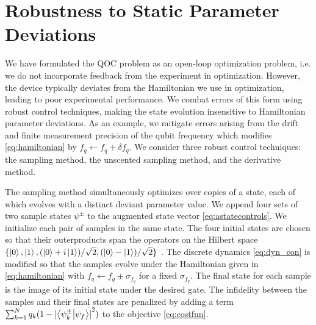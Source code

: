 \section{Robustness to Static Parameter Deviations \label{sec:static}}
We have formulated the QOC
problem as an open-loop optimization problem, i.e.
we do not incorporate feedback from the experiment in optimization.
However, the device typically deviates from the Hamiltonian we use in optimization,
leading to poor experimental performance. We combat errors
of this form using robust control techniques,
making the state evolution insensitive
to Hamiltonian parameter deviations. As an example,
we mitigate errors arising from the drift and finite measurement
precision of the qubit frequency which modifies \eqref{eq:hamiltonian}
by $f_{q} \gets f_{q} + \delta f_{q}$.
We consider three robust control techniques:
the sampling method, the unscented sampling method,
and the derivative method.

The sampling method simultaneously optimizes over copies of a state,
each of which evolves with a distinct deviant parameter value.
We append four sets of two sample states $\psi^{\pm}$
to the augmented state vector \eqref{eq:astatecontrols}.
We initialize each pair of samples in the same state.
The four initial states are chosen so that their outerproducts
span the operators on the Hilbert space
$\{\ket{0}, \ket{1}, (\ket{0} + i\ket{1}) / \sqrt{2},
(\ket{0} - \ket{1}) / \sqrt{2}\}$ \cite{chow2009randomized}.
The discrete dynamics \eqref{eq:dyn_con} is modified so that the
samples evolve under the Hamiltonian given in \eqref{eq:hamiltonian}
with $f_{q} \gets f_{q} \pm \sigma_{f_{q}}$ for a fixed $\sigma_{f_{q}}$.
The final state
for each sample is the image of its initial state
under the desired gate. The infidelity between
the samples and their final states are penalized
by adding a term
$\sum_{k=1}^{N} q_{k} (1 - {\lvert \braket{\psi^{\pm}_{k}}{\psi_{f}} \rvert}^{2})$
to the objective \eqref{eq:costfun}.

